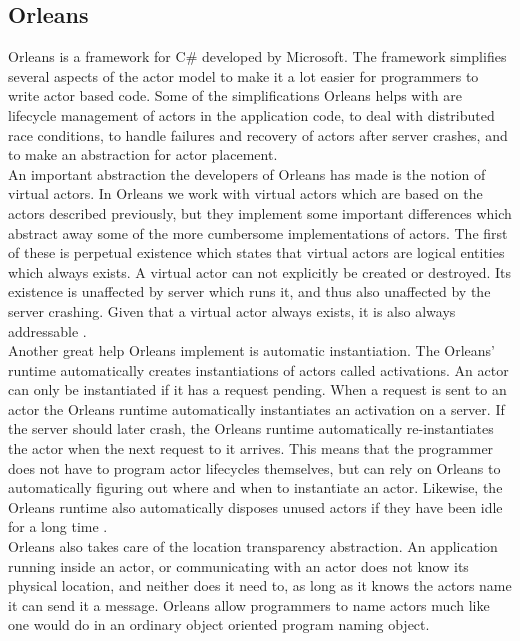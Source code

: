 \subsection{Orleans}
Orleans is a framework for C\# developed by Microsoft. The framework simplifies several aspects of the actor model to make it a lot easier for programmers to write actor based code. Some of the simplifications Orleans helps with are lifecycle management of actors in the application code, to deal with distributed race conditions, to handle failures and recovery of actors after server crashes, and to make an abstraction for actor placement.\\
An important abstraction the developers of Orleans has made is the notion of virtual actors. In Orleans we work with virtual actors which are based on the actors described previously, but they implement some important differences which abstract away some of the more cumbersome implementations of actors. The first of these is perpetual existence which states that virtual actors are logical entities which always exists. A virtual actor can not explicitly be created or destroyed. Its existence is unaffected by server which runs it, and thus also unaffected by the server crashing. Given that a virtual actor always exists, it is also always addressable \cite{OrleansPaper}.\\
Another great help Orleans implement is automatic instantiation. The Orleans' runtime automatically creates instantiations of actors called activations. An actor can only be instantiated if it has a request pending. When a request is sent to an actor the Orleans runtime automatically instantiates an activation on a server. If the server should later crash, the Orleans runtime automatically re-instantiates the actor when the next request to it arrives. This means that the programmer does not have to program actor lifecycles themselves, but can rely on Orleans to automatically figuring out where and when to instantiate an actor. Likewise, the Orleans runtime also automatically disposes unused actors if they have been idle for a long time \cite{OrleansPaper}.\\
Orleans also takes care of the location transparency abstraction. An application running inside an actor, or communicating with an actor does not know its physical location, and neither does it need to, as long as it knows the actors name it can send it a message. Orleans allow programmers to name actors much like one would do in an ordinary object oriented program naming object.\\
